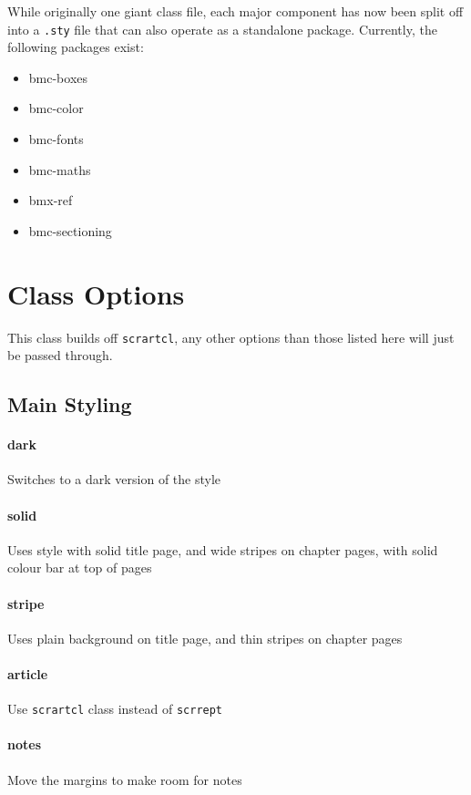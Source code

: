 \documentclass[solid,math,chem,code,plot,gloss]{bmc}
\begin{document}
While originally one giant class file, each major component has now been split off
into a \texttt{.sty} file that can also operate as a standalone package.
Currently, the following packages exist:
\begin{multicols}{2}
    \begin{itemize}
        \item bmc-boxes
        \item bmc-color
        \item bmc-fonts
        \item bmc-maths
        \item bmx-ref
        \item bmc-sectioning
    \end{itemize}
\end{multicols}

\section{Class Options}

This class builds off \texttt{scrartcl},
any other options than those listed here will just be passed through.

\subsection{Main Styling}

\paragraph{\ttfamily dark}
Switches to a dark version of the style
\paragraph{\ttfamily solid}
Uses style with solid title page, and wide stripes on chapter pages, with solid colour bar at top of pages
\paragraph{\ttfamily stripe}
Uses plain background on title page, and thin stripes on chapter pages
\paragraph{\ttfamily article}
Use \texttt{scrartcl} class instead of \texttt{scrrept}
\paragraph{\ttfamily notes}
Move the margins to make room for notes
\end{document}

